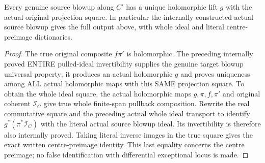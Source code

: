 \begin{theorem}
\label{hir:submersion-blowup-lift-actual-lift}
\leanok
{}
Every genuine source blowup along $C'$ has a unique holomorphic lift $g$ with the actual original projection square. In particular the internally constructed actual source blowup gives the full output above, with whole ideal and literal centre-preimage dictionaries.
\end{theorem}
\begin{proof}
The true original composite $f\pi'$ is holomorphic. The preceding internally proved ENTIRE pulled-ideal invertibility supplies the genuine target blowup universal property; it produces an actual holomorphic $g$ and proves uniqueness among ALL actual holomorphic maps with this SAME projection square. To obtain the whole ideal square, the actual holomorphic maps $g,\pi,f,\pi'$ and original coherent $\mathcal I_C$ give true whole finite-span pullback composition. Rewrite the real commutative square and the preceding actual whole ideal transport to identify $g^*(\pi^*\mathcal I_C)$ with the literal actual source blowup ideal. Its invertibility is therefore also internally proved. Taking literal inverse images in the true square gives the exact written centre-preimage identity. This last equality concerns the centre preimage; no false identification with differential exceptional locus is made.
\end{proof}

